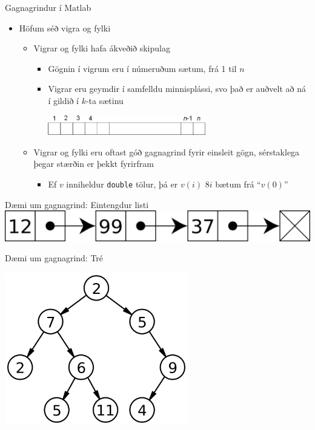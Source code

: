\documentclass{beamer}
\begin{document}
\begin{frame}{Gagnagrindur í Matlab}
\begin{itemize}
 \item Höfum séð vigra og fylki
 \begin{itemize}
  \item Vigrar og fylki hafa ákveðið skipulag
  \begin{itemize}
   \item Gögnin í vigrum eru í númeruðum sætum, frá 1 til $n$
   \item Vigrar eru geymdir í samfelldu minnisplássi, svo það er auðvelt að ná í gildið í $k$-ta sætinu
\begin{center}
\includegraphics[width=0.6\textwidth]{Pics/vector-index}
\end{center}
   \end{itemize}
  \item Vigrar og fylki eru oftast góð gagnagrind fyrir einsleit gögn, sérstaklega þegar stærðin er þekkt fyrirfram
  \begin{itemize}
   \item Ef $v$ inniheldur \texttt{double} tölur, þá er $v(i)$ $8i$ bætum frá ``$v(0)$''
  \end{itemize}
 \end{itemize}
\end{itemize}
\end{frame}

\begin{frame}{Dæmi um gagnagrind: Eintengdur listi}
\includegraphics[width=\textwidth]{Pics/singly-linked-list}
\end{frame}

\begin{frame}{Dæmi um gagnagrind: Tré}
\vspace{\baselineskip}
\begin{center}
\includegraphics[width=0.6\textwidth]{Pics/tree}
\end{center}
\end{frame}
\end{document}
